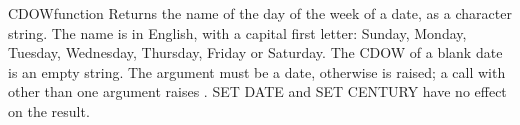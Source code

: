 \begin{XbaseEntry}{CDOW}{function}
Returns the name of the day of the week of a date, as a character string.
\Syntax
{}
\Usage
The name is in English, with a capital first letter: Sunday, Monday, Tuesday, Wednesday, Thursday, Friday or Saturday. The CDOW of a blank date is an empty string. The argument must be a date, otherwise  is raised; a call with other than one argument raises . SET DATE and SET CENTURY have no effect on the result.
\Examples
{}
\end{XbaseEntry}

